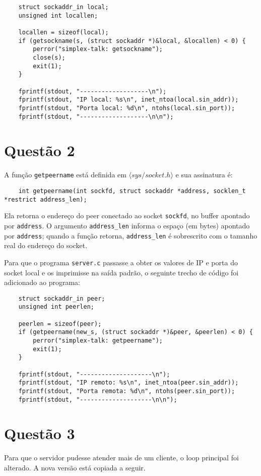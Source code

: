 \documentclass[a4paper,10pt]{article}
\begin{document}
\begin{lstlisting}
    struct sockaddr_in local;
    unsigned int locallen;

    locallen = sizeof(local);
    if (getsockname(s, (struct sockaddr *)&local, &locallen) < 0) {
        perror("simplex-talk: getsockname");
        close(s);
        exit(1);
    }

    fprintf(stdout, "-------------------\n");
    fprintf(stdout, "IP local: %s\n", inet_ntoa(local.sin_addr));
    fprintf(stdout, "Porta local: %d\n", ntohs(local.sin_port));
    fprintf(stdout, "-------------------\n\n");

\end{lstlisting}

\section{Questão 2}
A função {\tt getpeername} está definida em $\langle sys/socket.h \rangle$ e sua assinatura é:
    \begin{lstlisting}
    int getpeername(int sockfd, struct sockaddr *address, socklen_t *restrict address_len);
    \end{lstlisting}

Ela retorna o endereço do peer conectado ao socket {\tt sockfd}, no buffer apontado por {\tt address}. O argumento {\tt address\_len} informa o espaço (em bytes) apontado por {\tt address}; quando a função retorna, {\tt address\_len} é sobrescrito com o tamanho real do endereço do socket.

Para que o programa {\tt server.c} passasse a obter os valores de IP e porta do socket local e os imprimisse na saída padrão, o seguinte trecho de código foi adicionado ao programa:

\begin{lstlisting}
    struct sockaddr_in peer;
    unsigned int peerlen;

    peerlen = sizeof(peer);
    if (getpeername(new_s, (struct sockaddr *)&peer, &peerlen) < 0) {
        perror("simplex-talk: getpeername");
        exit(1);
    }

    fprintf(stdout, "--------------------\n");
    fprintf(stdout, "IP remoto: %s\n", inet_ntoa(peer.sin_addr));
    fprintf(stdout, "Porta remota: %d\n", ntohs(peer.sin_port));
    fprintf(stdout, "--------------------\n\n");

\end{lstlisting}

\section{Questão 3}
Para que o servidor pudesse atender mais de um cliente, o loop principal foi alterado. A nova versão está copiada a seguir.
\end{document}
